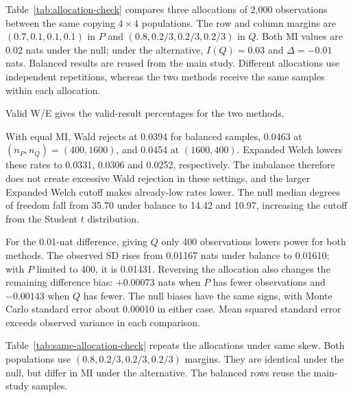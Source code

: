 Table~\ref{tab:allocation-check} compares three allocations of 2,000
observations between the same copying \(4\times4\) populations.
The row and column margins are \((0.7,0.1,0.1,0.1)\) in \(P\) and
\((0.8,0.2/3,0.2/3,0.2/3)\) in \(Q\). Both MI values are 0.02 nats
under the null; under the alternative, \(I(Q)=0.03\) and
\(\Delta=-0.01\) nats. Balanced results are reused from the main study.
Different allocations use independent repetitions, whereas
the two methods receive the same samples within each allocation.

Valid W/E gives the valid-result percentages for the two methods.

\begin{table}[H]
\centering
\small
\caption{Rejection and estimation diagnostics at fixed total sample size.}
\label{tab:allocation-check}

\end{table}

With equal MI, Wald rejects at 0.0394 for balanced samples, 0.0463 at
\((n_P,n_Q)=(400,1600)\), and 0.0454 at \((1600,400)\). Expanded Welch lowers these
rates to 0.0331, 0.0306 and 0.0252, respectively. The imbalance therefore
does not create excessive Wald rejection in these settings, and the
larger Expanded Welch cutoff makes already-low rates lower. The null median
degrees of freedom fall from 35.70 under balance to 14.42 and 10.97, increasing the
cutoff from the Student \(t\) distribution.

For the 0.01-nat difference, giving \(Q\) only 400 observations lowers
power for both methods. The observed SD rises from 0.01167 nats
under balance to 0.01610; with \(P\) limited to 400, it is 0.01431.
Reversing the allocation also changes the remaining difference bias:
\(+0.00073\) nats when \(P\) has fewer observations and
\(-0.00143\) when \(Q\) has fewer. The null biases have the same
signs, with Monte Carlo standard error about 0.00010 in either case.
Mean squared standard error exceeds observed variance in each comparison.

Table~\ref{tab:same-allocation-check} repeats the allocations under same
skew. Both populations use
\((0.8,0.2/3,0.2/3,0.2/3)\) margins. They are identical under the null,
but differ in MI under the alternative. The balanced rows reuse the
main-study samples.

\begin{table}[H]
\centering
\small
\setlength{\tabcolsep}{4pt}
\caption{Same-skew allocation comparisons at a fixed total of 2,000 observations.}
\label{tab:same-allocation-check}

\end{table}

